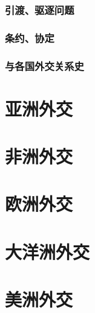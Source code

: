 \documentclass[UTF8]{../RepresentationUniverse}
\begin{document}
        \subsubsection{引渡、驱逐问题}
        \subsubsection{条约、协定}
        \subsubsection{与各国外交关系史}

\section{亚洲外交}
\section{非洲外交}
\section{欧洲外交}
\section{大洋洲外交}
\section{美洲外交}
\end{document}
